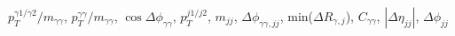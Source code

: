$p_T^{\gamma 1/\gamma 2}/m_{\gamma\gamma}$, $p_T^{\gamma\gamma}/m_{\gamma\gamma}$, $\cos{\Delta\phi_{\gamma\gamma}}$, $p_T^{j1/j2}$, $m_{jj}$, $\Delta\phi_{\gamma\gamma,jj}$, min($\Delta R_{\gamma,j}$), $C_{\gamma\gamma}$, $|\Delta\eta_{jj}|$, $\Delta\phi_{jj}$